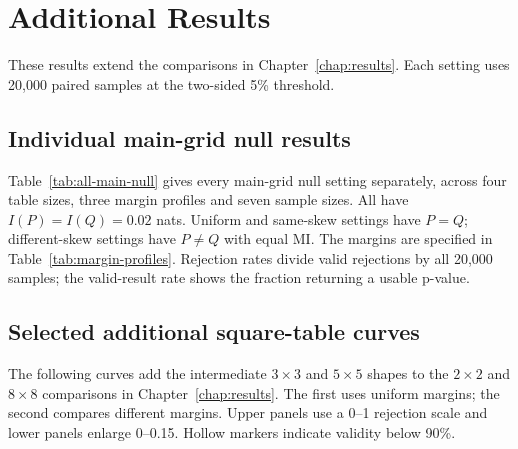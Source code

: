 \chapter{Additional Results}
\label{app:additional-results}

These results extend the comparisons in Chapter~\ref{chap:results}.
Each setting uses 20,000 paired samples at the two-sided 5\% threshold.

\section{Individual main-grid null results}

Table~\ref{tab:all-main-null} gives every main-grid null setting separately,
across four table sizes, three margin profiles and seven sample sizes.
All have \(I(P)=I(Q)=0.02\) nats. Uniform and same-skew settings have
\(P=Q\); different-skew settings have \(P\ne Q\) with equal MI\@.
The margins are specified in Table~\ref{tab:margin-profiles}.
Rejection rates divide valid rejections by all 20,000 samples; the valid-result
rate shows the fraction returning a usable p-value.



\section{Selected additional square-table curves}

The following curves add the intermediate \(3\times3\) and \(5\times5\)
shapes to the \(2\times2\) and \(8\times8\) comparisons in
Chapter~\ref{chap:results}. The first uses uniform margins; the second
compares different margins. Upper panels use a 0--1 rejection scale and
lower panels enlarge 0--0.15. Hollow markers indicate validity below 90\%.



